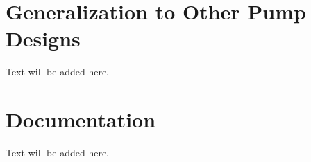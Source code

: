 

\label{sec:conclusion}

\section{Generalization to Other Pump Designs}
Text will be added here.

\section{Documentation}
Text will be added here.

